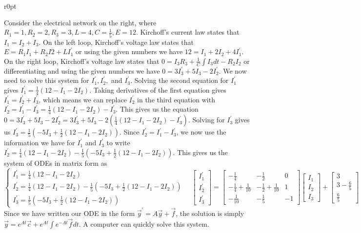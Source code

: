 \begin{wrapfigure}{r}{0pt}
\end{wrapfigure}
Consider the electrical network on the right, where $R_1=1,R_2=2,R_3=3, L=4, C=\frac{1}{5}, E=12$.  Kirchoff's current law states that $I_1=I_2+I_3$.  On the left loop, Kirchoff's voltage law states that $E = R_1I_1+R_2I2+LI_1^\prime$ or using the given numbers we have $12 = I_1+2I_2+4I_1^\prime$.  On the right loop, Kirchoff's voltage law states that $0=I_3R_3 +\frac{1}{C}\int I_3 dt - R_2I_2$ or differentiating and using the given numbers we have $0 = 3I_3^\prime+5I_3-2I_2^\prime$.  We now need to solve this system for $I_1^\prime, I_2^\prime,$ and $I_3^\prime$. Solving the second equation for $I_1^\prime$ gives $I_1^\prime = \frac{1}{4}(12-I_1-2I_2)$.  Taking derivatives of the first equation gives $I_1^\prime = I_2^\prime+I_3^\prime$, which means we can replace $I_2^\prime$ in the third equation with $I_2^\prime = I_1^\prime - I_3^\prime =  \frac{1}{4}(12-I_1-2I_2) - I_3^\prime$. This gives us the equation $0 = 3I_3^\prime+5I_3-2I_2^\prime = 3I_3^\prime+5I_3-2\left(\frac{1}{4}(12-I_1-2I_2) - I_3^\prime\right)$. Solving for $I_3^\prime$ gives us $I_3^\prime = \frac{1}{5}\left(-5I_3+\frac{1}{2}(12-I_1-2I_2)\right)$.  Since $I_2^\prime = I_1^\prime - I_3^\prime$, we now use the information we have for $I_1^\prime$ and $I_3^\prime$ to write $I_2^\prime = \frac{1}{4}(12-I_1-2I_2) - \frac{1}{5}\left(-5I_3+\frac{1}{2}(12-I_1-2I_2)\right)$.  This gives us the system of ODEs in matrix form as 
$$
\begin{cases} 
I_1^\prime = \frac{1}{4}(12-I_1-2I_2)\\
I_2^\prime = \frac{1}{4}(12-I_1-2I_2) - \frac{1}{5}\left(-5I_3+\frac{1}{2}(12-I_1-2I_2)\right)\\
I_3^\prime = \frac{1}{5}\left(-5I_3+\frac{1}{2}(12-I_1-2I_2)\right)
\end{cases} 
\quad
\begin{bmatrix}
I_1^\prime \\
I_2^\prime \\
I_3^\prime 
\end{bmatrix}
=
\begin{bmatrix}
-\frac{1}{4} & -\frac{1}{2} & 0 \\
-\frac{1}{4}+\frac{1}{10} & -\frac{1}{2}+\frac{1}{10} &1\\
-\frac{1}{10}  & -\frac{1}{5} & -1
\end{bmatrix}
\begin{bmatrix}
I_1 \\
I_2 \\
I_3 
\end{bmatrix}
+
\begin{bmatrix}
3 \\
3-\frac65 \\
\frac65 
\end{bmatrix}
$$
Since we have written our ODE in the form $\vec y ^\prime = A \vec y + \vec f$, the solution is simply $\vec y = e^{At}\vec c+e^{At}\int e^{-At} \vec f dt$.  A computer can quickly solve this system.



